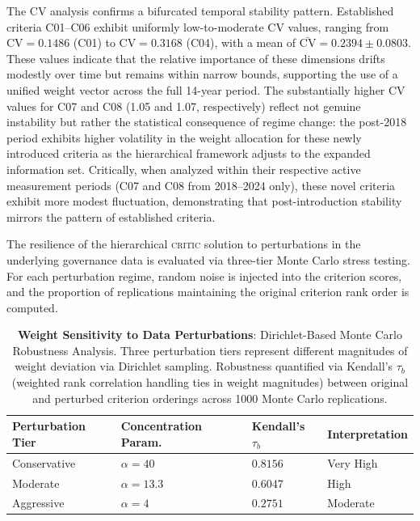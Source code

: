 \documentclass[12pt,a4paper]{article}
\newcommand{\CRITIC}{\textsc{critic}\xspace}
\begin{document}
The CV analysis confirms a bifurcated temporal stability pattern. Established criteria C01--C06 exhibit uniformly low-to-moderate CV values, ranging from $\mathrm{CV} = 0.1486$ (C01) to $\mathrm{CV} = 0.3168$ (C04), with a mean of $\bar{\mathrm{CV}} = 0.2394 \pm 0.0803$. These values indicate that the relative importance of these dimensions drifts modestly over time but remains within narrow bounds, supporting the use of a unified weight vector across the full 14-year period. The substantially higher CV values for C07 and C08 (1.05 and 1.07, respectively) reflect not genuine instability but rather the statistical consequence of regime change: the post-2018 period exhibits higher volatility in the weight allocation for these newly introduced criteria as the hierarchical framework adjusts to the expanded information set. Critically, when analyzed within their respective active measurement periods (C07 and C08 from 2018--2024 only), these novel criteria exhibit more modest fluctuation, demonstrating that post-introduction stability mirrors the pattern of established criteria.

\FloatBarrier

The resilience of the hierarchical \CRITIC solution to perturbations in the underlying governance data is evaluated via three-tier Monte Carlo stress testing. For each perturbation regime, random noise is injected into the criterion scores, and the proportion of replications maintaining the original criterion rank order is computed.

\begin{table}[H]
\centering
\caption{\textbf{Weight Sensitivity to Data Perturbations}: Dirichlet-Based Monte Carlo Robustness Analysis. Three perturbation tiers represent different magnitudes of weight deviation via Dirichlet sampling. Robustness quantified via Kendall's $\tau_b$ (weighted rank correlation handling ties in weight magnitudes) between original and perturbed criterion orderings across 1000 Monte Carlo replications.}
\label{tab:weight-sensitivity}
\small
\begin{tabularx}{0.80\textwidth}{>{\centering\arraybackslash}X>{\centering\arraybackslash}X>{\centering\arraybackslash}X>{\centering\arraybackslash}X}
\toprule
\textbf{Perturbation Tier} & \textbf{Concentration Param.} & \textbf{Kendall's $\tau_b$} & \textbf{Interpretation} \\
\midrule
Conservative & $\alpha = 40$ & $0.8156$ & Very High \\
Moderate & $\alpha = 13.3$ & $0.6047$ & High \\
Aggressive & $\alpha = 4$ & $0.2751$ & Moderate \\
\bottomrule
\end{tabularx}
\end{table}
\end{document}
